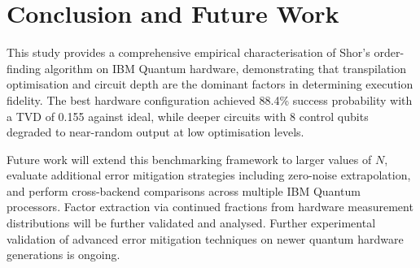 \documentclass[conference]{IEEEtran}
\begin{document}
\section{Conclusion and Future Work}

This study provides a comprehensive empirical characterisation of Shor's order-finding algorithm on IBM Quantum hardware, demonstrating that transpilation optimisation and circuit depth are the dominant factors in determining execution fidelity. The best hardware configuration achieved 88.4\% success probability with a TVD of 0.155 against ideal, while deeper circuits with 8 control qubits degraded to near-random output at low optimisation levels.

Future work will extend this benchmarking framework to larger values of $N$, evaluate additional error mitigation strategies including zero-noise extrapolation, and perform cross-backend comparisons across multiple IBM Quantum processors. Factor extraction via continued fractions from hardware measurement distributions will be further validated and analysed. Further experimental validation of advanced error mitigation techniques on newer quantum hardware generations is ongoing.
\end{document}
